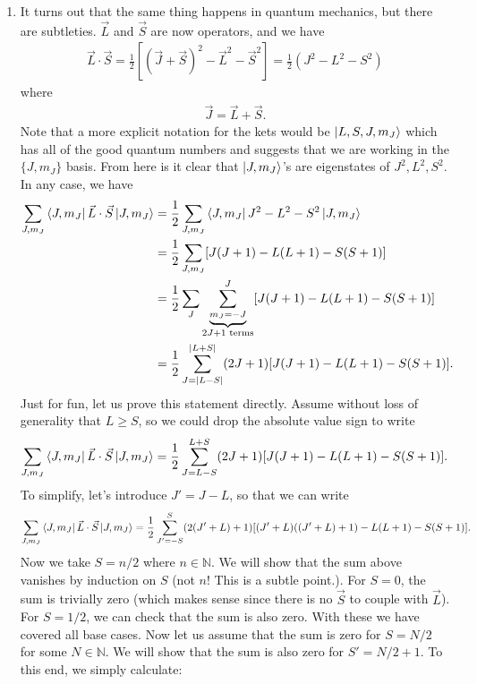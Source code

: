 \documentclass{article}
\theoremstyle{definition}
\newcommand{\f}[2]{\frac{#1}{#2}}
\newcommand{\lb}{\left[}
\newcommand{\rb}{\right]}
\begin{document}
\begin{enumerate}[label=(\alph*)]
	
	\item It turns out that the same thing happens in quantum mechanics, but there are subtleties. $\vec{L}$ and $\vec{S}$ are now operators, and we have
	\begin{align*}
	\vec{L}\cdot \vec{S} = \f{1}{2}\lb (\vec{J} + \vec{S})^2 - \vec{L}^2 - \vec{S}^2\rb = \f{1}{2}(J^2 - L^2 - S^2)
	\end{align*}
	where
	\begin{align*}
	\vec{J} = \vec{L} + \vec{S}.
	\end{align*}
	Note that a more explicit notation for the kets would be $\ket{L,S,J,m_J}$ which has all of the good quantum numbers and suggests that we are working in the $\{J,m_J\}$ basis. From here is it clear that $\ket{J,m_J}$'s are eigenstates of $J^2, L^2,S^2$.   In any case, we have 
	\begin{align*}
	\sum_{J,m_J} \bra{J,m_J} \vec{L}\cdot \vec{S} \ket{J,m_J} 
	&= \f{1}{2}\sum_{J,m_J} \bra{J,m_J} J^2 - L^2 - S^2 \ket{J,m_J}\\
	&= \f{1}{2}\sum_{J,m_J} [J(J+1) - L(L+1) - S(S+1)] \\
	&= \f{1}{2}\sum_{J} \underbrace{\sum_{m_J = -J}^J}_{2J+1 \text{ terms}}[J(J+1) - L(L+1) - S(S+1)] \\
	&= \f{1}{2} \sum_{J=\abs{L-S}}^{\abs{L+S}} (2J+1) [J(J+1) - L(L+1) - S(S+1)].
	\end{align*}
	Just for fun, let us prove this statement directly. Assume without loss of generality that $L\geq S$, so we could drop the absolute value sign to write
	\begin{align*}
	\sum_{J,m_J} \bra{J,m_J} \vec{L}\cdot \vec{S} \ket{J,m_J} = \f{1}{2} \sum_{J={L-S}}^{{L+S}} (2J+1) [J(J+1) - L(L+1) - S(S+1)].
	\end{align*}
	To simplify, let's introduce $J' = J-L$, so that we can write
	\begin{align*}
	\sum_{J,m_J} \bra{J,m_J} \vec{L}\cdot \vec{S} \ket{J,m_J} = \f{1}{2} \sum_{J'={-S}}^{{S}} (2 (J' + L) + 1)[(J' + L) ((J' + L) + 1) - L (L + 1) - S (S + 1)].
	\end{align*}
	Now we take $S = n/2$ where $n\in \mathbb{N}$. We will show that the sum above vanishes by induction on $S$ (not $n$! This is a subtle point.). For $S=0$, the sum is trivially zero (which makes sense since there is no $\vec{S}$ to couple with $\vec{L}$). For $S=1/2$, we can check that the sum is also zero. With these we have covered all base cases. Now let us assume that the sum is zero for $S=N/2$ for some $N\in \mathbb{N}$. We will show that the sum is also zero for $S' = N/2+1$. To this end, we simply calculate:

\end{enumerate}
\end{document}

